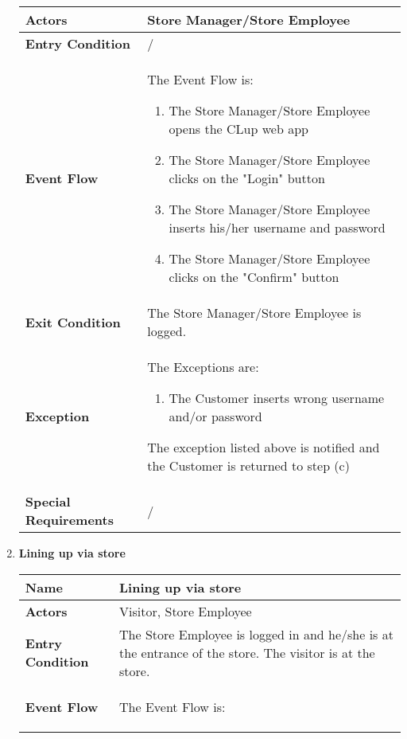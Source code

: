\begin{enumerate}
{\begin{longtable}{|L{4cm}|L{10cm}|}
                \hline
                \textbf{Actors} & Store Manager/Store Employee \\
                \hline
                \textbf{Entry Condition} & / \\
                \hline
                \textbf{Event Flow} & The Event Flow is: \begin{enumerate}
                        \item The Store Manager/Store Employee opens the CLup web app
                        \item The Store Manager/Store Employee clicks on the "Login" button
                        \item The Store Manager/Store Employee inserts his/her username and password
                        \item The Store Manager/Store Employee clicks on the "Confirm" button
                    \end{enumerate} \\
                \hline
                \textbf{Exit Condition} & The Store Manager/Store Employee is logged. \\
                \hline
                \textbf{Exception} & The Exceptions are: \begin{enumerate}
                        \item The Customer inserts wrong username and/or password
                    \end{enumerate} The exception listed above is notified and the Customer is returned to step (c) \\
                \hline
                \textbf{Special Requirements} & / \\
                \hline
            \end{longtable}}
            \item \textbf{Lining up via store}{\renewcommand{\arraystretch}{2}
            \begin{longtable}{|L{4cm}|L{10cm}|}
                \hline
                \textbf{Name} & Lining up via store \\
                \hline
                \textbf{Actors} & Visitor, Store Employee \\
                \hline
                \textbf{Entry Condition} & The Store Employee is logged in and he/she is at the entrance of the store. The visitor is at the store. \\
                \hline
                \textbf{Event Flow} & The Event Flow is: \begin{enumerate}

\end{enumerate}
\end{longtable}}
\end{enumerate}
